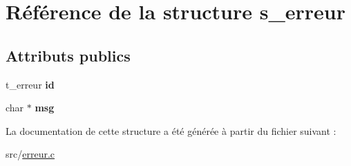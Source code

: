 \hypertarget{structs__erreur}{}\section{Référence de la structure s\+\_\+erreur}
\label{structs__erreur}
\subsection*{Attributs publics}
\begin{DoxyCompactItemize}
\item 
\mbox{\label{structs__erreur_ab2f5167237e1daa0acdfdd89e2d23db8}} 
t\+\_\+erreur {\bfseries id}
\item 
\mbox{\label{structs__erreur_af0d32190a9ffa4c6cd54f48e4982f80b}} 
char $\ast$ {\bfseries msg}
\end{DoxyCompactItemize}


La documentation de cette structure a été générée à partir du fichier suivant \+:\begin{DoxyCompactItemize}
\item 
src/\hyperlink{erreur_8c}{erreur.\+c}\end{DoxyCompactItemize}
